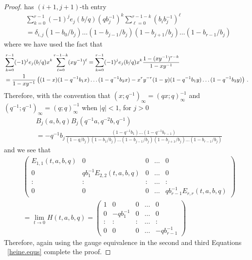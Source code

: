 \documentclass[12pt,reqno]{amsart}
\theoremstyle{definition}
\def\be{\begin{equation}}
\def\ee{\end{equation}}
\begin{document}
\begin{proof}
has $(i+1,j+1)$-th entry
\be
\begin{aligned}
  &\sum_{k=0}^{r-1}(-1)^{j}e_{j}(b/q)(qb_{j}^{-1})^{k}
  \sum_{\ell=0}^{r-1-k}(b_{i}b_{j}^{-1})^{\ell}\\
  &=
  \delta_{i,j}(1-b_{0}/b_{j})\dots(1-b_{j-1}/b_{j})(1-b_{j+1}/b_{j})
  \dots(1-b_{r-1}/b_{j})\
\end{aligned}
\ee
where we have used the fact that
\be
\begin{small}
\begin{aligned}
    &\sum_{k=0}^{r-1}(-1)^{j}e_{j}(b/q)x^{k}\sum_{\ell=0}^{r-1-k}(xy^{-1})^{\ell}
    =
    \sum_{k=0}^{r-1}(-1)^{j}e_{j}(b/q)x^{k}\frac{1-(xy^{-1})^{r-k}}{1-xy^{-1}}\\
    &=
    \frac{1}{1-xy^{-1}}\left((1-x)(1-q^{-1}b_{1}x)
 \dots(1-q^{-1}b_{2}x)-x^{r}y^{-r}(1-y)(1-q^{-1}b_{1}y)\dots(1-q^{-1}b_{2}y)\right)\,.
\end{aligned}
\end{small}
\ee
Therefore, with the convention that $(x;q^{-1})_{\infty}=(qx;q)_{\infty}^{-1}$ and
$(q^{-1};q^{-1})_{\infty}=(q;q)_{\infty}^{-1}$ when $|q|<1$, for $j>0$
\be
\begin{aligned}
  &B_{j}(a,b,q)B_{j}(q^{-1}a,q^{-2}b,q^{-1})\\
  &=-q^{-1}b_{j}\frac{(1-q^{-1}b_{1})\dots(1-q^{-1}b_{r-1})}{(1-q/b_{j})(1-b_{1}/b_{j})
    \dots(1-b_{j-1}/b_{j})(1-b_{j+1}/b_{j})\dots(1-b_{r-1}/b_{j})}
\end{aligned}
\ee
and we see that
\be
\begin{aligned}
  &\begin{pmatrix}
    E_{1,1}(t,a,b,q) & 0 & 0 & \dots & 0\\
    0 & qb_{1}^{-1}E_{2,2}(t,a,b,q) & 0 & \dots & 0\\
    : & : & : & \dots & :\\
    0 & 0 & 0 & \dots & qb_{r-1}^{-1}E_{r,r}(t,a,b,q)
  \end{pmatrix}\\
  &=
  \lim_{t\rightarrow 0}H(t,a,b,q)
  =
  \begin{pmatrix}
    1 & 0 & 0 & \dots & 0\\
    0 & -qb_{1}^{-1} & 0 & \dots & 0\\
    : & : & : & \dots & :\\
    0 & 0 & 0 & \dots & -qb_{r-1}^{-1}
  \end{pmatrix}
\end{aligned}
\ee
Therefore, again using the gauge equivalence in the second and third Equations
~\eqref{heine.equs} complete the proof.
\end{proof}
\end{document}

